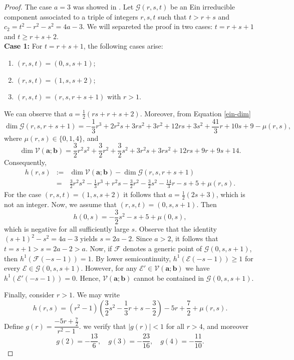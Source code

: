 \documentclass[twoside,reqno]{amsart}
\theoremstyle{plain}
\begin{document}
\begin{proof}
The case $a=3$ was showed in \cite[Theorem 14]{F2024}. Let $\mathcal{G}(r,s,t)$ be an Ein irreducible component 
associated to a triple of integers $r,s, t$ such that $t>r+s$ and $c_2=t^2-r^2-s^2=4a-3$. We will 
separeted the proof in two cases: $t=r+s+1$ and $t\geq r+s+2$.\\
\textbf{Case 1:} For \( t = r + s + 1 \), the following cases arise:
\begin{enumerate}
    \item[a)] \((r,s,t) = (0,s,s+1)\);
    \item[b)] \((r,s,t) = (1,s,s+2)\);
    \item[c)] \((r,s,t) = (r,s,r+s+1)\) with \( r > 1 \).
\end{enumerate}
We can observe that \( a = \frac{1}{2}(rs + r + s + 2) \). Moreover, from Equation \eqref{ein-dim}
\[
\dim \mathcal{G}(r,s,r+s+1) = -\frac{1}{3}r^{3} + 2r^{2}s + 3rs^{2} + 3r^{2} + 12rs + 3s^{2} + \frac{41}{3}r + 10s + 9 - \mu(r,s),
\]
where \(\mu(r,s) \in\{0,1,4\}\), and
\[
\dim \mathcal{V}(\boldsymbol{a};\boldsymbol{b}) = \frac{3}{2}r^{2}s^{2} + \frac{3}{2}r^{2} + \frac{3}{2}s^{2} + 3r^{2}s + 3rs^{2} + 12rs + 9r + 9s + 14.
\]
Consequently,
\begin{eqnarray*}
h(r,s) & := & \dim \mathcal{V}(\boldsymbol{a};\boldsymbol{b}) - \dim \mathcal{G}(r,s,r+s+1) \\
& = & \frac{3}{2}r^{2}s^{2} - \frac{1}{3}r^{3} + r^{2}s - \frac{3}{2}r^{2} - \frac{3}{2}s^{2} - \frac{14}{3}r - s + 5 + \mu(r,s) .
\end{eqnarray*}
For the case \((r,s,t) = (1,s,s+2)\) it follows that $a = \frac{1}{2}(2s+3)$, which is not an integer.
Now, we assume that $(r,s,t)=(0,s,s+1)$. Then
\[
h(0,s) = -\frac{3}{2}s^{2} - s + 5 + \mu(0,s),
\]
which is negative for all sufficiently large \( s \). Observe that the identity \((s+1)^2 - s^2 = 4a - 3\) yields \( s = 2a - 2 \). Since \( a > 2 \), it follows that \( t = s + 1 > s = 2a - 2 > a \).  
Now, if \( \mathcal{F} \) denotes a generic point of \( \mathcal{G}(0,s,s+1) \), then \( h^1(\mathcal{F}(-s-1)) = 1 \). By 
lower semicontinuity, \( h^1(\mathcal{E}(-s-1)) \geq 1 \) for every 
\( \mathcal{E} \in \mathcal{G}(0,s,s+1) \). However, for any \( \mathcal{E}' \in \mathcal{V}(\boldsymbol{a};\boldsymbol{b}) \) we have \( h^1(\mathcal{E}'(-s-1)) = 0 \). Hence, 
\( \mathcal{V}(\boldsymbol{a};\boldsymbol{b}) \) cannot be contained 
in \( \mathcal{G}(0,s,s+1) \).

Finally, consider \( r > 1 \). We may write
\[
h(r,s) = (r^2 - 1)\left( \frac{3}{2}s^{2} - \frac{1}{3}r + s - \frac{3}{2} \right) - 5r + \frac{7}{2} + \mu(r,s) .
\]
Define \( g(r) = \dfrac{-5r + \frac{7}{2}}{r^2 - 1} \). we verify that \( |g(r)| < 1 \) for all \( r > 4 \), and moreover
\[
g(2) = -\frac{13}{6}, \quad g(3) = -\frac{23}{16}, \quad g(4) = -\frac{11}{10}.
\]


\end{proof}
\end{document}
